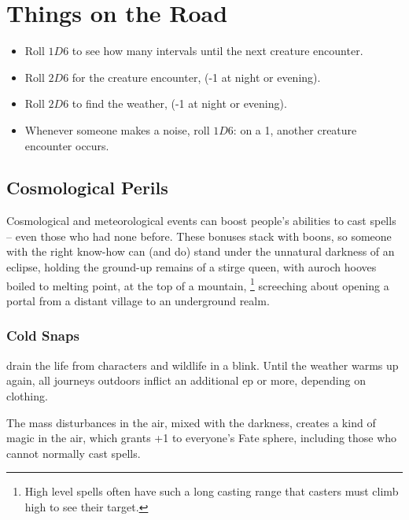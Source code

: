 \section{Things on the Road}
\label{randomEncounters}

\begin{multicols}{2}

\begin{itemize}
  \item
  Roll $1D6$ to see how many \glspl{interval} until the next creature encounter.
  \item
  Roll $2D6$ for the creature encounter,  (-1 at night or evening).
  \item
  Roll $2D6$ to find the weather,  (-1 at night or evening).
  \item
  Whenever someone makes a noise, roll $1D6$: on a 1, another creature encounter occurs.
\end{itemize}

\subsection{Cosmological Perils}
\label{weather}
Cosmological and meteorological events can boost people's abilities to cast spells -- even those who had none before.
These bonuses stack with \glspl{boon}, so someone with the right know-how can (and do) stand under the unnatural darkness of an eclipse, holding the ground-up remains of a stirge queen, with auroch hooves boiled to melting point, at the top of a mountain,%
\footnote{High level spells often have such a long casting range that casters must climb high to see their target.}
screeching about opening a portal from a distant \gls{village} to an underground realm.

\subsubsection{Cold Snaps}
drain the life from characters and wildlife in a blink.
Until the weather warms up again, all \glspl{journey} outdoors inflict an additional \gls{ep} or more, depending on clothing.

The mass disturbances in the air, mixed with the darkness, creates a kind of magic in the air, which grants +1 to everyone's Fate \gls{sphere}, including those who cannot normally cast spells.


\end{multicols}
